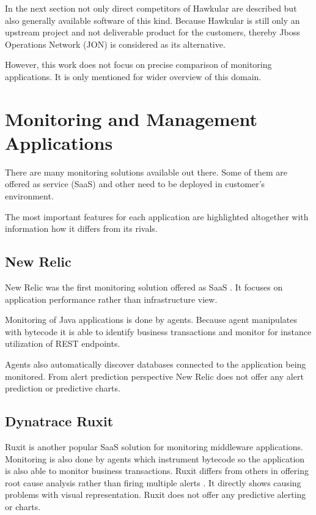 In the next section not only direct competitors of Hawkular are described but also
generally available software of this kind. Because Hawkular is still only an upstream project and not deliverable
product for the customers, thereby Jboss Operations Network (JON) is considered as its alternative.

However, this work does not focus on precise comparison of monitoring applications. It is only mentioned for wider
overview of this domain.

    \section{Monitoring and Management Applications}
    There are many monitoring solutions available out there. Some of them are offered as service (SaaS) and other need
    to be deployed in customer's environment.

    The most important features for each application are highlighted altogether with information how it differs from its
    rivals. %

        \subsection{New Relic}
        New Relic was the first monitoring solution offered as SaaS \cite{new-relic}. It focuses on application
        performance rather than infrastructure view.

        Monitoring of Java applications is done by agents. Because agent manipulates with bytecode it is able to
        identify business transactions and monitor for instance utilization of REST endpoints.

        Agents also automatically discover databases connected to the application being monitored. From alert
        prediction perspective New Relic does not offer any alert prediction or predictive charts.

        \subsection{Dynatrace Ruxit}
        Ruxit is another popular SaaS solution for monitoring middleware applications. Monitoring is also done by agents
        which instrument bytecode so the application is also able to monitor business transactions. Ruxit differs from
        others in offering root cause analysis rather than firing multiple alerts \cite{ruxit}. It directly shows
        causing problems with visual representation. Ruxit does not offer any predictive alerting or charts.

